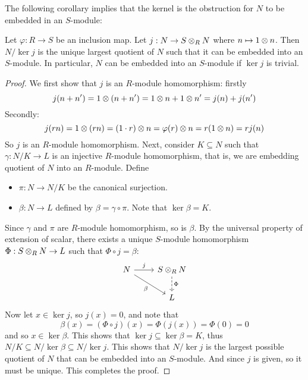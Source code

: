 The following corollary implies that the kernel is the obstruction for $N$ to be embedded in an $S$-module:
\begin{cor}
    Let $\varphi:R\to S$ be an inclusion map. Let $j:N\to S \otimes_R N$ where $n\mapsto 1\otimes n$. Then $N/\ker j$ is the unique largest quotient of $N$ such that it can be embedded into an $S$-module. In particular, $N$ can be embedded into an $S$-module if $\ker j$ is trivial.
\end{cor}
\begin{proof}
    We first show that $j$ is an $R$-module homomorphism: firstly
	\[j(n+n') = 1\otimes (n+n') = 1\otimes n + 1\otimes n' = j(n) + j(n')\]
	Secondly:
	\[j(rn) = 1\otimes (rn) = (1\cdot r)\otimes n = \varphi(r) \otimes n = r(1\otimes n) = r j(n)\]
	So $j$ is an $R$-module homomorphism. Next, consider $K\subseteq N$ such that $\gamma:N/K \to L$ is an injective $R$-module homomorphism, that is, we are embedding quotient of $N$ into an $R$-module. Define
	\begin{itemize}
		\item $\pi:N\to N/K$ be the canonical surjection.
		\item $\beta:N\to L$ defined by $\beta = \gamma\circ \pi$. Note that $\ker \beta = K$.
	\end{itemize}
	Since $\gamma$ and $\pi$ are $R$-module homomorphism, so is $\beta$. By the universal property of extension of scalar, there exists a unique $S$-module homomorphism $\Phi:S\otimes_R N\to L$ such that $\Phi \circ j = \beta$:
	\[\begin{tikzcd} [sep=small]
	 N && {S\ten_R N} \\
	\\
	&& L
	\arrow["j", from=1-1, to=1-3]
	\arrow["\beta"', from=1-1, to=3-3]
	\arrow["\Phi", dashed, from=1-3, to=3-3]
    \end{tikzcd}\]
	Now let $x\in \ker j$, so $j(x) = 0$, and note that 
	\[\beta(x) = (\Phi \circ j)(x) = \Phi(j(x)) = \Phi(0) = 0\]
	and so $x\in \ker \beta$. This shows that $\ker j\subseteq \ker \beta = K$, thus $N/K \subseteq N/\ker \beta \subseteq N/\ker j$. This shows that $N/\ker j$ is the largest possible quotient of $N$ that can be embedded into an $S$-module. And since $j$ is given, so it must be unique. This completes the proof.
\end{proof}

